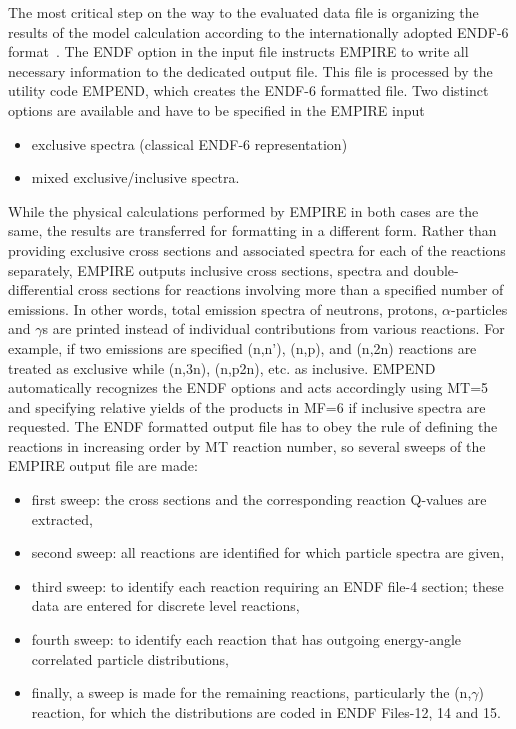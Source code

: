 \documentclass[twocolumn,amsmath,amssymb,10pt,groupedaddress,letter]{revtex4}
\begin{document}
The most critical step on the way to the evaluated data file is organizing the results of the model calculation according to the internationally adopted ENDF-6 format~\cite{Herman:05a}.
The ENDF option in the input file instructs EMPIRE to
write all necessary information to the dedicated output file.
This file is processed by the utility
code EMPEND, which creates the ENDF-6 formatted file.
Two distinct options are available and have to be specified in the EMPIRE input
\begin{itemize}
\item exclusive spectra (classical ENDF-6 representation)
\item mixed exclusive/inclusive spectra.
\end{itemize}
While the physical calculations performed by EMPIRE in both
cases are the same, the results are transferred for formatting in
a different form. Rather than providing exclusive cross sections and
associated spectra for each of the reactions separately, EMPIRE outputs
inclusive cross sections, spectra and double-differential cross sections for
reactions involving more than a specified number of emissions.
In other words, total emission spectra of neutrons, protons, $\alpha$-particles
and $\gamma$s are printed instead of individual contributions from
various reactions. For example, if two
emissions are specified (n,n'), (n,p), and (n,2n) reactions are treated as exclusive while
(n,3n), (n,p2n), etc. as inclusive.
EMPEND automatically recognizes
the ENDF options and acts accordingly using MT=5 and specifying relative
yields of the products in MF=6 if inclusive spectra are requested.
The ENDF formatted
output file has to obey the rule of defining the reactions in increasing
order by MT reaction number, so several sweeps of the EMPIRE output file
are made:
\begin{itemize}
\item first sweep: the cross sections and the corresponding reaction Q-values
are extracted,
\item second sweep: all reactions are identified for which particle spectra
are given,
\item third sweep: to identify each reaction requiring an ENDF file-4 section;
these data are entered for discrete level reactions,
\item fourth sweep: to identify each reaction that has outgoing energy-angle
correlated particle distributions,
\item finally, a sweep is made for the remaining reactions, particularly
the (n,$\gamma$) reaction, for which the distributions are coded
in ENDF Files-12, 14 and 15.
\end{itemize}
\end{document}
